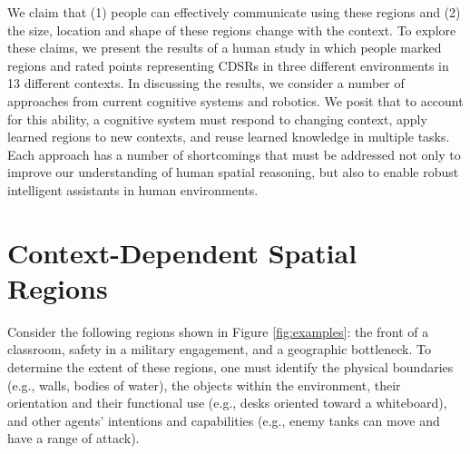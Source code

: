 \documentclass[11pt,letterpaper]{article}
\begin{document}
We claim that (1) people can effectively communicate using these regions and (2) the size, location and shape of these regions change with the context.  To explore these claims, we present the results of a human study in which people marked regions and rated points representing CDSRs in three different environments in 13 different contexts.  In discussing the results, we consider a number of approaches from current cognitive systems and robotics.  We posit that to account for this ability, a cognitive system must respond to changing context, apply learned regions to new contexts, and reuse learned knowledge in multiple tasks.  Each approach has a number of shortcomings that must be addressed not only to improve our understanding of human spatial reasoning, but also to enable robust intelligent assistants in human environments.

\section{Context-Dependent Spatial Regions}\label{sec:cdsrs}

Consider the following regions shown in Figure \ref{fig:examples}: the front of a classroom, safety in a military engagement, and a geographic bottleneck.  To determine the extent of these regions, one must identify the physical boundaries (e.g., walls, bodies of water), the objects within the environment, their orientation and their functional use (e.g., desks oriented toward a whiteboard), and other agents' intentions and capabilities (e.g., enemy tanks can move and have a range of attack).%
\end{document}
